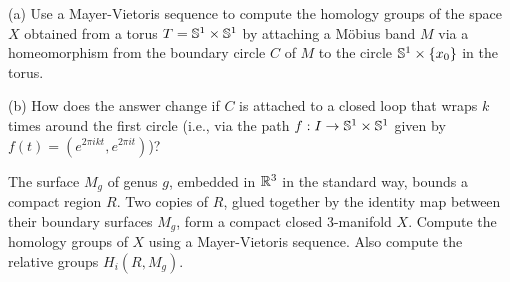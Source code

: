 \vfill{} (a) Use a Mayer-Vietoris sequence to compute the homology groups of the space $X$ obtained from a torus $T=\mathbb{S}^1\times \mathbb{S}^1$ by attaching a M\"obius band $M$ via a homeomorphism from the boundary circle $C$ of $M$ to the circle $\mathbb{S}^1\times\{x_0\}$ in the torus.

(b) How does the answer change if $C$ is attached to a closed loop that wraps $k$ times around the first circle (i.e., via the path $f:I\to\mathbb{S}^1\times\mathbb{S}^1$ given by $f(t)=(e^{2\pi i kt},e^{2\pi it})$)?

\vfill\prob [Hatcher p.158 \#29] The surface $M_g$ of genus $g$, embedded in $\mathbb{R}^3$ in the standard way, bounds a compact region $R$.  Two copies of $R$, glued together by the identity map between their boundary surfaces $M_g$, form a compact closed 3-manifold $X$.  Compute the homology groups of $X$ using a Mayer-Vietoris sequence.  Also compute the relative groups  $H_i(R,M_g)$.


